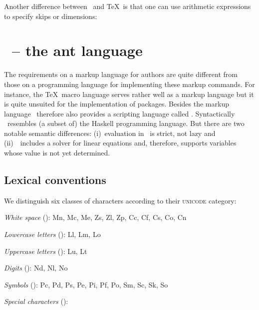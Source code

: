 Another difference between \ant\ and \TeX\ is that one can use arith\-me\-tic expressions
to specify skips or dimensions\?:
\begin{code}
  \blue
  \cs{\hskip}\texttt\textlbrace\cs{2em} \cs{+} \texttt\textrbrace
\end{code}



\section{\AL\ -- the ant language}   %


The requirements on a markup language for authors are quite different from those
on a programming language for implementing these markup commands.
For instance, the \TeX\ macro language serves rather well as a markup language
but it is quite unsuited for the implementation of packages.
Besides the markup language \ant\ therefore also provides a scripting language
called \AL.
Syntactically \AL\ resembles (a subset of) the Haskell programming language.
But there are two notable semantic differences\?: (i)~evaluation in \AL\ is strict, not lazy
and (ii)~\AL\ includes a solver for linear equations and, therefore, supports variables whose value
is not yet determined.


\subsection{Lexical conventions}


We distinguish six classes of characters according to their \textsc{unicode} category\?:

\medskip
\begin{description}
\item{\textit{White space} ()\?:} Mn, Mc, Me, Zs, Zl, Zp, Cc, Cf, Cs, Co, Cn
\item{\textit{Lowercase letters} ()\?:} Ll, Lm, Lo
\item{\textit{Uppercase letters} ()\?:} Lu, Lt
\item{\textit{Digits} ()\?:} Nd, Nl, No
\item{\textit{Symbols} ()\?:} Pc, Pd, Ps, Pe, Pi, Pf, Po, Sm, Sc, Sk, So
\item{\textit{Special characters} ()\?:}   \cs{,} \cs{;} \cs{_} \cs{(} \cs{)}
  \cs{[} \cs{]} {\blue\texttt\textlbrace\ \texttt\textrbrace}
\end{description}

